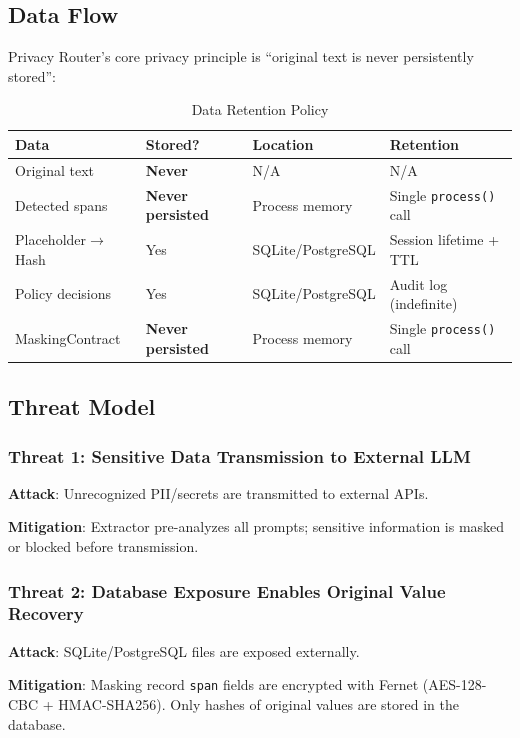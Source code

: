 \documentclass[11pt,a4paper]{article}
\begin{document}
\subsection{Data Flow}

Privacy Router's core privacy principle is ``original text is never persistently stored'':

\begin{table}[h]
\centering
\begin{tabular}{@{}llll@{}}
\toprule
Data & Stored? & Location & Retention \\
\midrule
Original text & \textbf{Never} & N/A & N/A \\
Detected spans & \textbf{Never persisted} & Process memory & Single \texttt{process()} call \\
Placeholder$\rightarrow$Hash & Yes & SQLite/PostgreSQL & Session lifetime + TTL \\
Policy decisions & Yes & SQLite/PostgreSQL & Audit log (indefinite) \\
MaskingContract & \textbf{Never persisted} & Process memory & Single \texttt{process()} call \\
\bottomrule
\end{tabular}
\caption{Data Retention Policy}
\end{table}

\subsection{Threat Model}

\subsubsection{Threat 1: Sensitive Data Transmission to External LLM}

\textbf{Attack}: Unrecognized PII/secrets are transmitted to external APIs.

\textbf{Mitigation}: Extractor pre-analyzes all prompts; sensitive information is masked or blocked before transmission.

\subsubsection{Threat 2: Database Exposure Enables Original Value Recovery}

\textbf{Attack}: SQLite/PostgreSQL files are exposed externally.

\textbf{Mitigation}: Masking record \texttt{span} fields are encrypted with Fernet (AES-128-CBC + HMAC-SHA256). Only hashes of original values are stored in the database.
\end{document}
